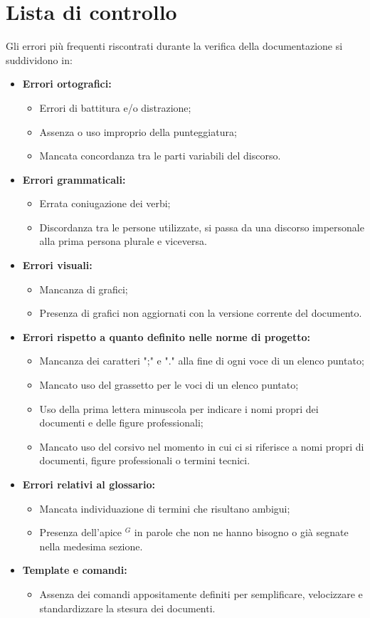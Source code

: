 \section{Lista di controllo}
\label{lista_controllo}
Gli errori più frequenti riscontrati durante la verifica della documentazione si suddividono in:
\begin{itemize}
	\item \textbf{Errori ortografici:}
	\begin{itemize}
		\item Errori di battitura e/o distrazione;
		\item Assenza o uso improprio della punteggiatura;
		\item Mancata concordanza tra le parti variabili del discorso.
	\end{itemize}
	\item \textbf{Errori grammaticali:}
	\begin{itemize}
		\item Errata coniugazione dei verbi;
		\item Discordanza tra le persone utilizzate, si passa da una discorso impersonale alla prima persona plurale e viceversa.
	\end{itemize}
	\item \textbf{Errori visuali:}
	\begin{itemize}
		\item Mancanza di grafici;
		\item Presenza di grafici non aggiornati con la versione corrente del documento.
	\end{itemize}
	\item \textbf{Errori rispetto a quanto definito nelle norme di progetto:}
	\begin{itemize}
		\item Mancanza dei caratteri ";" e "." alla fine di ogni voce di un elenco puntato;
		\item Mancato uso del grassetto per le voci di un elenco puntato;
		\item Uso della prima lettera minuscola per indicare i nomi propri dei documenti e delle figure professionali;
		\item Mancato uso del corsivo nel momento in cui ci si riferisce a nomi propri di documenti, figure professionali o termini tecnici.
	\end{itemize}
	\item \textbf{Errori relativi al glossario:}
	\begin{itemize}
		\item Mancata individuazione di termini che risultano ambigui;
		\item Presenza dell'apice $^G$ in parole che non ne hanno bisogno o già segnate nella medesima sezione.
	\end{itemize}
	\item \textbf{Template e comandi:}
	\begin{itemize}
		\item Assenza dei comandi appositamente definiti per semplificare, velocizzare e standardizzare la stesura dei documenti.
	\end{itemize}
\end{itemize}